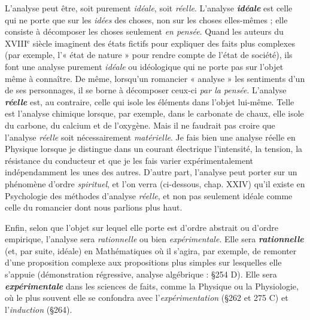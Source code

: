 L'analyse peut être, soit purement {\it idéale}, soit {\it réelle}. L'analyse
\textbf{\textit {idéale}} est celle qui ne porte que sur les {\it idées} des choses, non sur les
choses elles-mêmes ; elle consiste à décomposer les choses seulement
{\it en pensée}. Quand les auteurs du {\footnotesize XVIII}$^\text{e}$ siècle imaginent des états
fictifs pour expliquer des faits plus complexes (par exemple, l’« état
de nature » pour rendre compte de l’état de société), ils font une analyse
purement {\it idéale} ou idéologique qui ne porte pas sur l’objet même à
connaître. De même, lorsqu'un romancier « analyse » les sentiments
d’un de ses personnages, il se borne à décomposer ceux-ci {\it par la
pensée}. L'analyse \textbf{\textit {réelle}} est, au contraire, celle qui isole les éléments
dans l’objet lui-même. Telle est l’analyse chimique lorsque, par
exemple, dans le carbonate de chaux, elle isole du carbone, du calcium
et de l’oxygène. Mais il ne faudrait pas croire que l’analyse {\it réelle}
soit nécessairement {\it matérielle}. Je fais bien une analyse réelle en
Physique lorsque je distingue dans un courant électrique l’intensité,
la tension, la résistance du conducteur et que je les fais varier expérimentalement
indépendamment les unes des autres. D’autre part, l’analyse
peut porter sur un phénomène d’ordre {\it spirituel}, et l’on verra
(ci-dessous, chap. XXIV) qu’il existe en Psychologie des méthodes
d’analyse {\it réelle}, et non pas seulement idéale comme celle du romancier
dont nous parlions plus haut.

Enfin, selon que l’objet sur lequel elle porte est d’ordre abstrait
ou d'ordre empirique, l’analyse sera {\it rationnelle} ou bien {\it expérimentale}.
Elle sera \textbf{\textit {rationnelle}} (et, par suite, {\it }idéale) en Mathématiques où il
s'agira, par exemple, de remonter d’une proposition complexe aux
propositions plus simples sur lesquelles elle s’appuie (démonstration
régressive, analyse algébrique : \S 254 D). Elle sera \textbf{\textit {expérimentale}} dans
les sciences de faits, comme la Physique ou la Physiologie, où le plus
souvent elle se confondra avec l’{\it expérimentation} (\S 262 et 275 C) et
l'{\it induction} (\S 264).

